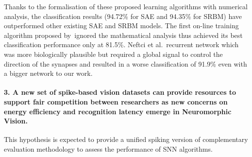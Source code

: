 \DIFaddend Thanks to the formalisation of these proposed learning algorithms with numerical analysis, the classification results (94.72\% for SAE and 94.35\% for SRBM) have outperformed other existing SAE and SRBM models.
The first on-line training algorithm proposed by~\DIFdelbegin {}\DIFdelend \DIFaddbegin {}\DIFaddend ignored the mathematical analysis thus achieved its best classification performance only at 81.5\%.
Neftci et al.~\DIFdelbegin {}\DIFdelend \DIFaddbegin {}\DIFaddend recurrent network which was more biologically plausible but required a global signal to control the direction of the synapses and resulted in a worse classification of 91.9\% even with a bigger network \DIFdelbegin {}\DIFdelend \DIFaddbegin {}\DIFaddend to our work.


\paragraph{3. A new set of spike-based vision datasets can provide resources to support fair competition between researchers as new concerns on energy efficiency and recognition latency emerge in Neuromorphic Vision.}
This hypothesis is expected to provide a unified spiking version of \DIFdelbegin {}\DIFdelend \DIFaddbegin {}\DIFaddend complementary evaluation methodology to assess the performance of SNN algorithms.

